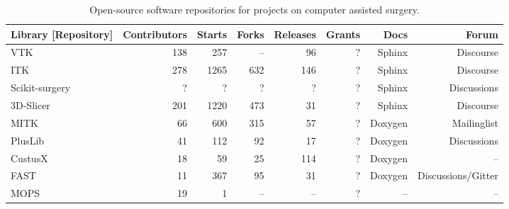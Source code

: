 \documentclass{article}
\begin{document}

\begin{table}[ht]
\centering
\begin{tabular}{l|r|r|r|r|r|r|r} %
Library [Repository] & Contributors & Starts & Forks & Releases  &  Grants & Docs & Forum  \\ %
\hline

VTK \cite{vtk-repo} & 138 & 257 & -- & 96 & ? & Sphinx & Discourse \\ %


ITK \cite{itk-repo} & 278 & 1265 & 632 & 146 & ? & Sphinx & Discourse \\ %

Scikit-surgery \cite{scikitsurgery-repo} & ? & ? & ?& ? & ? & Sphinx & Discussions \\ %


3D-Slicer \cite{slicer-repo} & 201 & 1220 & 473 & 31 & ? & Sphinx & Discourse \\ %


MITK \cite{mitk-repo} & 66 & 600 & 315 & 57 & ? & Doxygen & Mailinglist \\ %


PlusLib \cite{plus-repo} & 41 & 112 & 92 & 17 & ? & Doxygen & Discussions \\ %

CustusX \cite{custusX-repo} & 18 & 59 & 25 & 114 & ? & Doxygen & -- \\ %

FAST \cite{fast-repo} & 11 & 367 & 95 & 31 & ? & Doxygen & Discussions/Gitter \\ %

MOPS \cite{mops-repo} & 19 & 1 & -- & -- & ? & -- & -- \\ %



\end{tabular}
\caption{Open-source software repositories for projects on computer assisted surgery.}
\label{table2}
\end{table}
\end{document}
